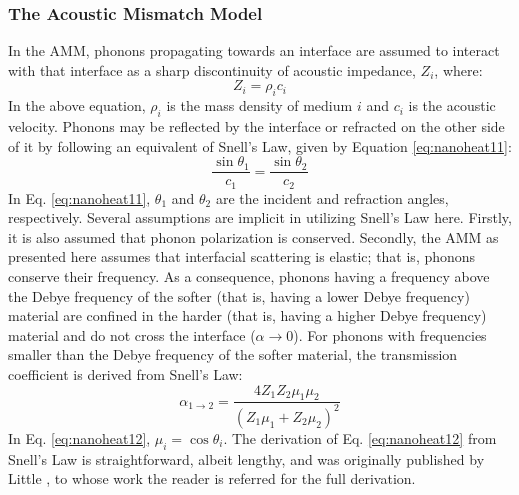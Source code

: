 \subsubsection{The Acoustic Mismatch Model} In the AMM, phonons propagating towards an interface are assumed to interact with that interface as a sharp discontinuity of acoustic impedance, $Z_i$, where:
\begin{equation}\label{eq:nanoheat10}
Z_i = \rho_ic_i
\end{equation}
In the above equation, $\rho_i$ is the mass density of medium $i$ and $c_i$ is the acoustic velocity. Phonons may be reflected by the interface or refracted on the other side of it by following an equivalent of Snell's Law, given by Equation \ref{eq:nanoheat11}:
\begin{equation}\label{eq:nanoheat11}
\frac{\sin{\theta_1}}{c_1} = \frac{\sin{\theta_2}}{c_2}
\end{equation}
In Eq. \ref{eq:nanoheat11}, $\theta_1$ and $\theta_2$ are the incident and refraction angles, respectively. Several assumptions are implicit in utilizing Snell's Law here. Firstly, it is also assumed that phonon polarization is conserved. Secondly, the AMM as presented here assumes that interfacial scattering is elastic; that is, phonons conserve their frequency. As a consequence, phonons having a frequency above the Debye frequency of the softer (that is, having a lower Debye frequency) material are confined in the harder (that is, having a higher Debye frequency) material and do not cross the interface ($\alpha \rightarrow 0$). For phonons with frequencies smaller than the Debye frequency of the softer material, the transmission coefficient is derived from Snell's Law:
\begin{equation}\label{eq:nanoheat12}
\alpha_{1 \rightarrow 2}  = \frac{4Z_1Z_2\mu_1\mu_2}{\left(Z_1\mu_1 + Z_2\mu_2\right)^2} 
\end{equation}
In Eq. \ref{eq:nanoheat12}, $\mu_i = \cos{\theta_i}$. The derivation of Eq. \ref{eq:nanoheat12} from Snell's Law is straightforward, albeit lengthy, and was originally published by Little \cite{little1959transport}, to whose work the reader is referred for the full derivation.  
